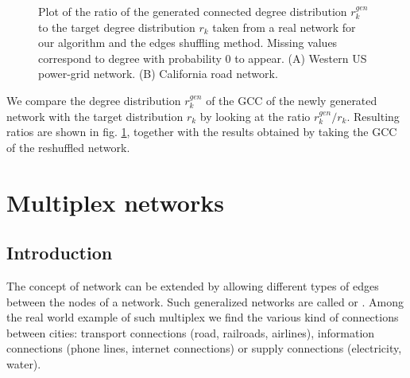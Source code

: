 \documentclass[
11pt, %
american, %
singlespacing, %
final, %
nolistspacing, %
liststotoc, %
headsepline, %
]{MastersDoctoralThesis} %
\begin{document}
\begin{figure}
	\hfill
	\caption{Plot of the ratio of the generated connected degree distribution $r^{gen}_k$ to the target degree distribution $r_k$ taken from a real network for our algorithm and the edges shuffling method. Missing values correspond to degree with probability $0$ to appear. (A) Western US power-grid network. (B) California road network.}
	\label{Figure: Real examples}
\end{figure}

We compare the degree distribution $r^{gen}_k$ of the GCC of the newly generated network with the target distribution $r_k$ by looking at the ratio $r^{gen}_k / r_k$. Resulting ratios are shown in fig. \ref{Figure: Real examples}, together with the results obtained by taking the GCC of the reshuffled network.


\chapter{Multiplex networks}
\label{Section: Multiplex networks}

\section{Introduction}

The concept of network can be extended by allowing different types of edges between the nodes of a network. Such generalized networks are called  or . Among the real world example of such multiplex we find the various kind of connections between cities: transport connections (road, railroads, airlines), information connections (phone lines, internet connections) or supply connections (electricity, water).
\end{document}
